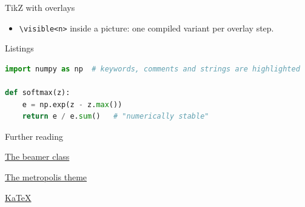 \begin{frame}{TikZ with overlays}
  \begin{center}
  \end{center}
  \begin{itemize}
    \item \texttt{\textbackslash visible<n>} inside a picture: one compiled variant per overlay step.
  \end{itemize}
\end{frame}

\begin{frame}[fragile]{Listings}
\begin{lstlisting}[language=Python, basicstyle=\ttfamily\small, keywordstyle=\color{brand}\bfseries]
import numpy as np  # keywords, comments and strings are highlighted

def softmax(z):
    e = np.exp(z - z.max())
    return e / e.sum()   # "numerically stable"
\end{lstlisting}
\end{frame}

\begin{frame}{Further reading}
  \begin{enumerate}[ {[}1{]} ]
    \item \href{https://ctan.org/pkg/beamer}{The beamer class}
    \item \href{https://github.com/matze/mtheme}{The metropolis theme}
    \item \href{https://katex.org}{KaTeX}
  \end{enumerate}
\end{frame}

